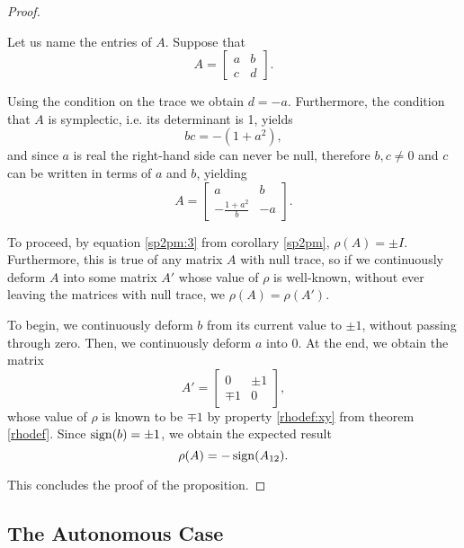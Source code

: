\begin{proof}
\begin{lemmaproof}
Let us name the entries of $A$. Suppose that
\begin{equation}
A = \begin{bmatrix}
a & b\\
c & d
\end{bmatrix}.
\end{equation}

Using the condition on the trace we obtain $d = -a$. Furthermore, the condition that $A$ is symplectic, i.e. its determinant is 1, yields
\begin{equation}
bc = -(1 + a^2),
\end{equation}
and since $a$ is real the right-hand side can never be null, therefore $b, c \neq 0$ and $c$ can be written in terms of $a$ and $b$, yielding
\begin{equation}
A = \begin{bmatrix}
a & b\\
-\frac{1+a^2}b & -a
\end{bmatrix}.
\end{equation}

To proceed, by equation \eqref{sp2pm:3} from corollary \ref{sp2pm}, $\rho(A) = \pm I$. Furthermore, this is true of any matrix $A$ with null trace, so if we continuously deform $A$ into some matrix $A'$ whose value of $\rho$ is well-known, without ever leaving the matrices with null trace, we $\rho(A) = \rho(A')$.

To begin, we continuously deform $b$ from its current value to $\pm 1$, without passing through zero. Then, we continuously deform $a$ into 0. At the end, we obtain the matrix
\begin{equation}
A' = \begin{bmatrix}
0 & \pm 1\\
\mp 1 & 0
\end{bmatrix},
\end{equation}
whose value of $\rho$ is known to be $\mp 1$ by property \ref{rhodef:xy} from theorem \ref{rhodef}. Since $\operatorname{sign}(b) = \pm 1$, we obtain the expected result
\begin{equation}
\rho(A) = - \operatorname{sign}(A_{12}).
\end{equation}
\end{lemmaproof}

This concludes the proof of the proposition.
\end{proof}

\subsection{The Autonomous Case}

